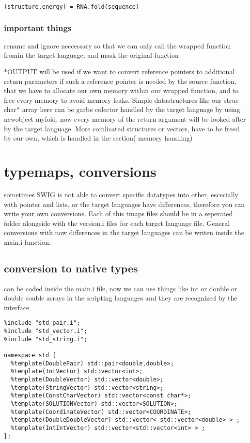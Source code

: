 \documentclass[ twoside,openright,titlepage,numbers=noenddot,headinclude,
                footinclude=true, cleardoublepage=empty,abstractoff, 
                BCOR=5mm,paper=a4,fontsize=11pt,
                ngerman,american,
                ]{scrreprt} %
\begin{document}
\begin{lstlisting}
(structure,energy) = RNA.fold(sequence)
\end{lstlisting}

\subsection{important things}

rename and ignore neccessary so that we can only call the wrapped function fromin the target language, and mask the original function
 
 *OUTPUT will be used if we want to convert reference pointers to additional return parameters
if such a reference pointer is needed by the source function, that we have to allocate our own memory within our wrapped function, and to free every memory to avoid memory leaks. Simple datastructures like our struc char* array here can be garbe colector handled by the target language by using newobject myfold. now every memory of the return argument will be looked after by the target language.
More comlicated structures or vectors, have to be freed by our own, which is handled in the section( memory handling)
 




\chapter{typemaps, conversions}
sometimes SWIG is not able to convert specific datatypes into other, escecially with pointer and lists, or the target languages have differences, therefore you can write your own conversions.
Each of this tmaps files should be in a seperated folder alongside with the version.i files for each target language file. General conversions with now differences in the target languages can be writen inside the main.i function.



\section{conversion to native types}
can be coded inside the main.i file, now we can use things like int or double or double souble arrays in the scripting languages and they are recognized by the interface

\begin{lstlisting}
%include "std_pair.i";
%include "std_vector.i";
%include "std_string.i";

namespace std {
  %template(DoublePair) std::pair<double,double>;
  %template(IntVector) std::vector<int>;
  %template(DoubleVector) std::vector<double>;
  %template(StringVector) std::vector<string>;
  %template(ConstCharVector) std::vector<const char*>;
  %template(SOLUTIONVector) std::vector<SOLUTION>;
  %template(CoordinateVector) std::vector<COORDINATE>;
  %template(DoubleDoubleVector) std::vector< std::vector<double> > ;
  %template(IntIntVector) std::vector<std::vector<int> > ;
};

\end{lstlisting}
\end{document}
